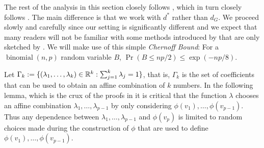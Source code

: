 \documentclass{patmorin}
\renewcommand{\le}{\leqslant}
\newcommand{\defin}[1]{\emph{\textcolor{brightmaroon}{#1}}}
\begin{document}


The rest of the analysis in this section closely follows \citet{rao:small}, which in turn closely follows \citet{feige:approximating}.  The main difference is that we work with $d^*$ rather than $d_G$.  We proceed slowly and carefully since our setting is significantly different and we expect that many readers will not be familiar with some methods introduced by \citet{feige:approximating} that are only sketched by \citet{rao:small}.
We will make use of this simple \defin{Chernoff Bound}:  For a $\operatorname{binomial}(n,p)$ random variable $B$, $\Pr(B \le np/2) \le \exp(-np/8)$.

Let $\Gamma_k:=\{(\lambda_1,\ldots,\lambda_k)\in \mathbb{R}^k:\sum_{j=1}^k\lambda_j=1\}$, that is, $\Gamma_k$ is the set of coefficients that can be used to obtain an affine combination of $k$ numbers.  In the following lemma, which is the crux of the proofs in \cite{rao:small,feige:approximating} it is critical that the function $\lambda$ chooses an affine combination $\lambda_1,\ldots,\lambda_{p-1}$ by only considering $\phi(v_1),\ldots,\phi(v_{p-1})$.  Thus any dependence between $\lambda_1,\ldots,\lambda_{p-1}$ and $\phi(v_p)$ is limited to random choices made during the construction of $\phi$ that are used to define $\phi(v_1),\ldots,\phi(v_{p-1})$.
\end{document}
